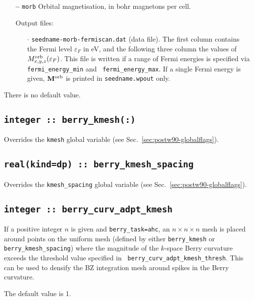 \begin{itemize}
\begin{itemize}
\end{itemize}

\item[{\bf --}] \verb#morb# Orbital magnetisation, in bohr magnetons
  per cell.

Output files:

\begin{itemize}

\item[$\cdot$] {\tt seedname-morb-fermiscan.dat} (data file). The
  first column contains the Fermi level $\varepsilon_F$ in eV, and the
  following three column the values of $M^{\rm
    orb}_{x,y,z}(\varepsilon_F)$.  This file is written if a range of
  Fermi energies is specified via {\tt fermi\_energy\_min} and {\tt
    fermi\_energy\_max}.  If a single Fermi energy is given, ${\bf
    M}^{\rm orb}$ is printed in {\tt seedname.wpout} only.

\end{itemize}

\end{itemize}
There is no default value.


\subsection[berry\_kmesh]{\tt integer :: berry\_kmesh(:)}
Overrides the \verb#kmesh# global variable (see
Sec.~\ref{sec:postw90-globalflags}).

\subsection[berry\_kmesh\_spacing]{\tt real(kind=dp) ::
  berry\_kmesh\_spacing}
Overrides the \verb#kmesh_spacing# global variable (see
Sec.~\ref{sec:postw90-globalflags}).


\subsection[berry\_adpt\_kmesh]{\tt integer :: berry\_curv\_adpt\_kmesh}
If a positive integer $n$ is given and {\tt berry\_task=ahc}, an
$n\times n\times n$ mesh is placed around points on the uniform mesh
(defined by either {\tt berry\_kmesh} or {\tt berry\_kmesh\_spacing})
where the magnitude of the $k$-space Berry curvature exceeds the
threshold value specified in {\tt
  berry\_curv\_adpt\_kmesh\_thresh}. This can be used to densify the
BZ integration mesh around spikes in the Berry curvature.

The default value is 1.


